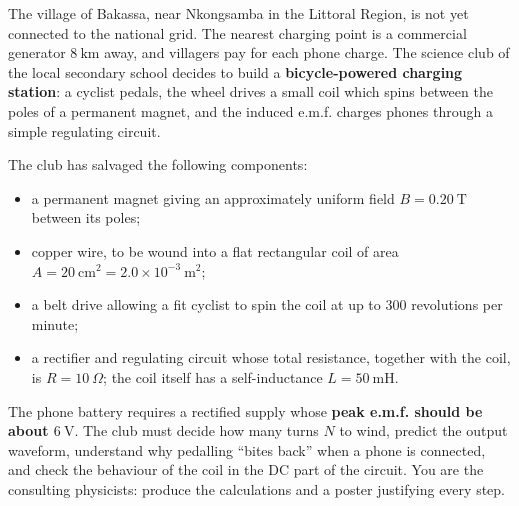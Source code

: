 \documentclass[11pt]{article}
\newcounter{popsec}
\newcounter{popsub}
\newcommand{\courssub}[1]{%
  \stepcounter{popsub}%
  \par\vspace{9pt}\noindent{\popxbold\fontsize{11.5}{13}\selectfont\color{popink}{\color{poporange}\thepopsec.\thepopsub}\hspace{6pt}#1}\par\nopagebreak\vspace{4pt}
}
\begin{document}
\courssub{Situation}

\begin{experience}
The village of Bakassa, near Nkongsamba in the Littoral Region, is not yet connected to the national grid. The nearest charging point is a commercial generator $8\ \mathrm{km}$ away, and villagers pay for each phone charge. The science club of the local secondary school decides to build a \textbf{bicycle-powered charging station}: a cyclist pedals, the wheel drives a small coil which spins between the poles of a permanent magnet, and the induced e.m.f. charges phones through a simple regulating circuit.

The club has salvaged the following components:
\begin{itemize}
\item a permanent magnet giving an approximately uniform field $B = 0.20\ \mathrm{T}$ between its poles;
\item copper wire, to be wound into a flat rectangular coil of area $A = 20\ \mathrm{cm^2} = 2.0\times 10^{-3}\ \mathrm{m^2}$;
\item a belt drive allowing a fit cyclist to spin the coil at up to $300$ revolutions per minute;
\item a rectifier and regulating circuit whose total resistance, together with the coil, is $R = 10\ \Omega$; the coil itself has a self-inductance $L = 50\ \mathrm{mH}$.
\end{itemize}

The phone battery requires a rectified supply whose \textbf{peak e.m.f. should be about $6\ \mathrm{V}$}. The club must decide how many turns $N$ to wind, predict the output waveform, understand why pedalling ``bites back'' when a phone is connected, and check the behaviour of the coil in the DC part of the circuit. You are the consulting physicists: produce the calculations and a poster justifying every step.
\end{experience}

\courssub{Tasks}
\end{document}
